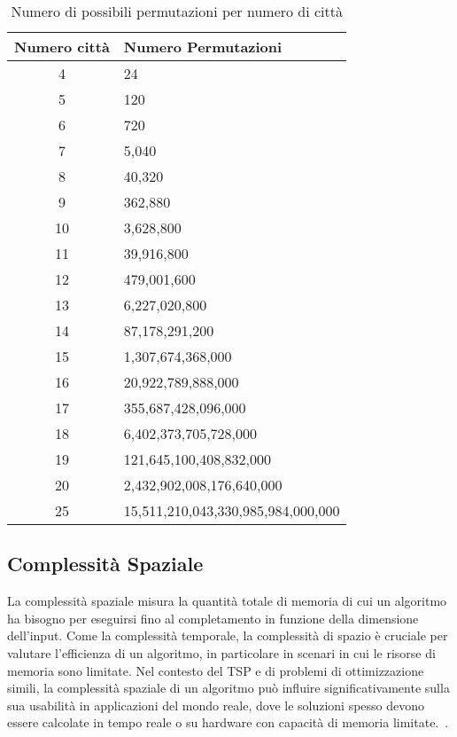 \begin{table}[h]
	\centering
	\caption{Numero di possibili permutazioni per numero di città}
	\begin{tabular}{c l}
		\toprule
		Numero città & Numero Permutazioni                \\
		\midrule
		4            & 24                                 \\
		5            & 120                                \\
		6            & 720                                \\
		7            & 5,040                              \\
		8            & 40,320                             \\
		9            & 362,880                            \\
		10           & 3,628,800                          \\
		11           & 39,916,800                         \\
		12           & 479,001,600                        \\
		13           & 6,227,020,800                      \\
		14           & 87,178,291,200                     \\
		15           & 1,307,674,368,000                  \\
		16           & 20,922,789,888,000                 \\
		17           & 355,687,428,096,000                \\
		18           & 6,402,373,705,728,000              \\
		19           & 121,645,100,408,832,000            \\
		20           & 2,432,902,008,176,640,000          \\
		25           & 15,511,210,043,330,985,984,000,000 \\
		\bottomrule
	\end{tabular}
\end{table}

\subsection{Complessità Spaziale}

La complessità spaziale misura la quantità totale di memoria di cui un algoritmo ha bisogno per eseguirsi fino al completamento in funzione della dimensione dell'input. Come la complessità temporale, la complessità di spazio è cruciale per valutare l'efficienza di un algoritmo, in particolare in scenari in cui le risorse di memoria sono limitate. Nel contesto del \gls{TSP} e di problemi di ottimizzazione simili, la complessità spaziale di un algoritmo può influire significativamente sulla sua usabilità in applicazioni del mondo reale, dove le soluzioni spesso devono essere calcolate in tempo reale o su hardware con capacità di memoria limitate.~\cite{HeldKarp1962}.

